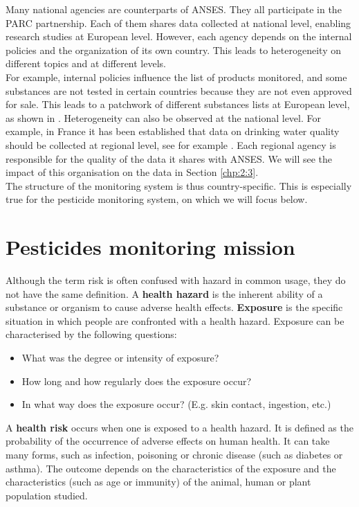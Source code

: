 Many national agencies are counterparts of ANSES. They all participate in the PARC partnership. Each of them shares data collected at national level, enabling research studies at European level. However, each agency depends on the internal policies and the organization of its own country. This leads to heterogeneity on different topics and at different levels. \\
For example, internal policies influence the list of products monitored, and some substances are not tested in certain countries because they are not even approved for sale. This leads to a patchwork of different substances lists at European level, as shown in \cite{Baran2022}. Heterogeneity can also be observed at the national level. For example, in France it has been established that data on drinking water quality should be collected at regional level, see for example \cite{Baran2022}. Each regional agency is responsible for the quality of the data it shares with ANSES. We will see the impact of this organisation on the data in Section \ref{chp:2:3}. \\
The structure of the monitoring system is thus country-specific. This is especially true for the pesticide monitoring system, on which we will focus below.

\section{Pesticides monitoring mission}\label{chp:2:2}

Although the term risk is often confused with hazard in common usage, they do not have the same definition. A \textbf{health hazard} is the inherent ability of a substance or organism to cause adverse health effects. \textbf{Exposure} is the specific situation in which people are confronted with a health hazard. Exposure can be characterised by the following questions:
\begin{itemize}
\item What was the degree or intensity of exposure?
\item How long and how regularly does the exposure occur? 
\item In what way does the exposure occur? (E.g. skin contact, ingestion, etc.)
\end{itemize}
A \textbf{health risk} occurs when one is exposed to a health hazard. It is defined as the probability of the occurrence of adverse effects on human health. It can take many forms, such as infection, poisoning or chronic disease (such as diabetes or asthma). The outcome depends on the characteristics of the exposure and the characteristics (such as age or immunity) of the animal, human or plant population studied.

